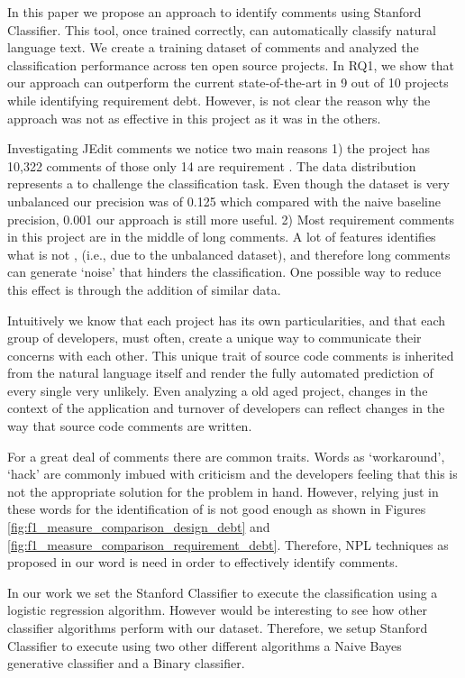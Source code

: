 In this paper we propose an approach to identify \SATD comments using Stanford Classifier. This tool, once trained correctly, can automatically classify natural language text. We create a training dataset of \SATD comments and analyzed the classification performance across ten open source projects. In RQ1, we show that our approach can outperform the current state-of-the-art in 9 out of 10 projects while identifying requirement debt. However, is not clear the reason why the approach was not as effective in this project as it was in the others.

Investigating JEdit comments we notice two main reasons 1) the project has 10,322 comments of those only 14 are requirement \SATD. The data distribution represents a to challenge the classification task. Even though the dataset is very unbalanced our precision was of 0.125 which compared with the naive baseline precision, 0.001 our approach is still more useful. 2) Most requirement \SATD comments in this project are in the middle of long comments. A lot of features identifies what is not \SATD, (i.e., due to the unbalanced dataset), and therefore long comments can generate `noise' that hinders the classification. One possible way to reduce this effect is through the addition of similar data. 

Intuitively we know that each project has its own particularities, and that each group of developers, must often, create a unique way to communicate their concerns with each other. This unique trait of source code comments is inherited from the natural language itself and render the fully automated prediction of every single \SATD very unlikely. Even analyzing a old aged project, changes in the context of the application and turnover of developers can reflect changes in the way that source code comments are written. 

For a great deal of \SATD comments there are common traits. Words as `workaround', `hack' are commonly imbued with criticism and the developers feeling that this is not the appropriate solution for the problem in hand. However, relying just in these words for the identification of \SATD is not good enough as shown in Figures \ref{fig:f1_measure_comparison_design_debt} and \ref{fig:f1_measure_comparison_requirement_debt}. Therefore, NPL techniques as proposed in our word is need in order to effectively identify \SATD comments.

In our work we set the Stanford Classifier to execute the classification using a logistic regression algorithm. However would be interesting to see how other classifier algorithms perform with our dataset. Therefore, we setup Stanford Classifier to execute using two other different algorithms a Naive Bayes generative classifier and a Binary classifier. 

